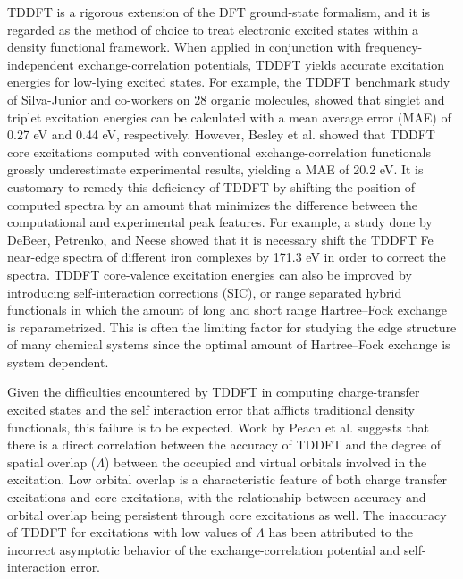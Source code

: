 \documentclass[12pt]{article}
\begin{document}
TDDFT is a rigorous extension of the DFT ground-state formalism,\cite{runge_density-functional_1984} and it is regarded as the method of choice to treat electronic excited states within a density functional framework.
 When applied in conjunction with frequency-independent exchange-correlation potentials, TDDFT yields accurate excitation energies for low-lying excited states. For example, the TDDFT benchmark study of Silva-Junior and co-workers\cite{silva-junior_benchmarks_2008} on 28 organic molecules, showed that singlet and triplet excitation energies can be calculated with a mean average error (MAE) of 0.27 eV and 0.44 eV, respectively. However, Besley et al.\cite{besley_self-consistent-field_2009} showed that TDDFT core excitations computed with conventional exchange-correlation functionals grossly underestimate experimental results, yielding a MAE of 20.2 eV. It is customary to remedy this deficiency of TDDFT by shifting the position of computed spectra by an amount that minimizes the difference between the computational and experimental peak features. For example, a study done by DeBeer, Petrenko, and Neese\cite{debeer_george_prediction_2008} showed that it is necessary shift the TDDFT Fe near-edge spectra of different iron complexes by 171.3 eV in order to correct the spectra.
 TDDFT core-valence excitation energies can also be improved by introducing self-interaction corrections (SIC),\cite{tu_core_2007} or range separated hybrid functionals in which the amount of long and short range Hartree--Fock exchange is reparametrized.\cite{besley_time-dependent_2009, nakata_time-dependent_2006} This is often the limiting factor for studying the edge structure of many chemical systems since the optimal amount of Hartree--Fock exchange is system dependent.\cite{capano_role_2013,besley_time-dependent_2007,besley_time-dependent_2010}

Given the difficulties encountered by TDDFT in computing charge-transfer excited states\cite{dreuw_failure_2004} and the self interaction error that afflicts traditional density functionals, this failure is to be expected.
Work by Peach et al. \cite{peach_excitation_2008} suggests that there is a direct correlation between the accuracy of TDDFT and the degree of spatial overlap ($\Lambda$) between the occupied and virtual orbitals involved in the excitation. Low orbital overlap is a characteristic feature of both charge transfer excitations and core excitations, with the relationship between accuracy and orbital overlap being persistent through core excitations as well. \cite{besley_time-dependent_2009}
The inaccuracy of TDDFT for excitations with low values of $\Lambda$ has been attributed to the incorrect asymptotic behavior of the exchange-correlation potential and self-interaction error.\cite{peach_excitation_2008}
\end{document}
